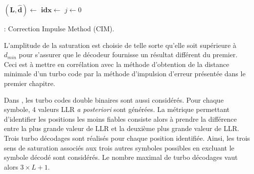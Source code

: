 \begin{center}
\begin{minipage}{.7\textwidth}%

		\begin{algorithm}[H]
		\DontPrintSemicolon

		$\mathbf{(L,\hat{d})} \gets$ \;
		$\mathbf{idx} \gets$ \;
		\;
		$j \gets 0$\;
	\caption{: Correction Impulse Method (CIM).}
	\label{alg:fsm}
	\end{algorithm}
\end{minipage}
\end{center}

L'amplitude de la saturation est choisie de telle sorte qu'elle soit supérieure à $d_{min}$ pour s'assurer que le décodeur 
fournisse un résultat différent du premier. Ceci est à mettre en corrélation avec la méthode d'obtention de la distance 
minimale d'un turbo code par la méthode d'impulsion d'erreur \cite{eim} présentée dans le premier chapitre.

Dans \cite{cim}, les turbo codes double binaires sont aussi considérés. Pour chaque symbole, 4 valeurs LLR \textit{a 
posteriori} sont générées. La métrique permettant d'identifier les positions les moins fiables consiste alors à prendre 
la différence entre la plus grande valeur de LLR et la deuxième plus grande valeur de LLR. Trois turbo décodages sont 
réalisés pour chaque position identifiée. Ainsi, les trois sens de saturation associés aux trois autres symboles possibles 
en excluant le symbole décodé sont considérés. Le nombre maximal de turbo décodages vaut alors $3\times L + 1$.

